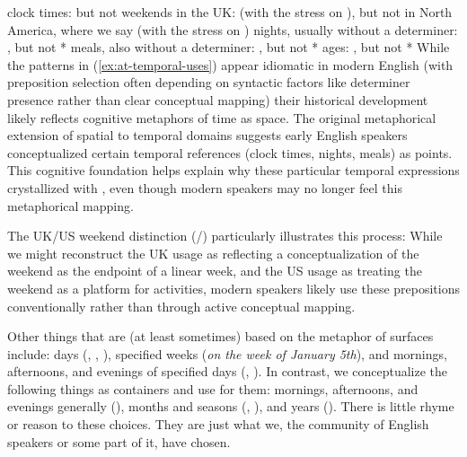 \ea\label{ex:at-temporal-uses}
    \ea clock times:  but not 
    \ex weekends in the UK:  (with the stress on ), but not in North America, where we say  (with the stress on )
    \ex nights, usually without a determiner: , but not *
    \ex meals, also without a determiner: , but not *
    \ex ages: , but not *
    \z
\z
While the patterns in (\ref{ex:at-temporal-uses}) appear idiomatic in modern English (with preposition selection often depending on syntactic factors like determiner presence rather than clear conceptual mapping) their historical development likely reflects cognitive metaphors of time as space. The original metaphorical extension of spatial  to temporal domains suggests early English speakers conceptualized certain temporal references (clock times, nights, meals) as points. This cognitive foundation helps explain why these particular temporal expressions crystallized with , even though modern speakers may no longer feel this metaphorical mapping.

The UK/US weekend distinction (/) particularly illustrates this process: While we might reconstruct the UK usage as reflecting a conceptualization of the weekend as the endpoint of a linear week, and the US usage as treating the weekend as a platform for activities, modern speakers likely use these prepositions conventionally rather than through active conceptual mapping.

Other things that are (at least sometimes) based on the metaphor of surfaces include: days (, , ), specified weeks (\textit{on the
week of January 5th}), and mornings, afternoons, and evenings of specified days
(, ). In contrast, we conceptualize
the following things as containers and use  for them: mornings, afternoons, and
evenings generally (), months and seasons (, ), and years (). There is little rhyme or reason to these choices.
They are just what we, the community of English speakers or some part of it,
have chosen.

